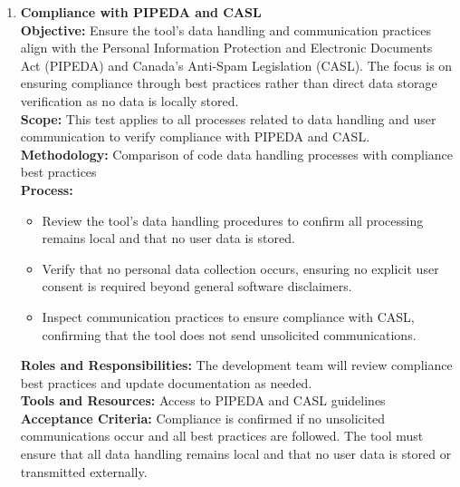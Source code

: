 \documentclass[12pt, titlepage]{article}
\begin{document}
\begin{enumerate}[label={\bf \textcolor{Maroon}{test-SRT-\arabic*}}, wide=0pt, font=\itshape]
\begin{enumerate}[label={\bf \textcolor{Maroon}{test-CPL-\arabic*}}, wide=0pt, font=\itshape]
  \item \textbf{Compliance with PIPEDA and CASL} \\[2mm]
    \textbf{Objective:} Ensure the tool’s data handling and communication practices align with the Personal Information Protection and Electronic Documents Act (PIPEDA) and Canada’s Anti-Spam Legislation (CASL). The focus is on ensuring compliance through best practices rather than direct data storage verification as no data is locally stored. \\[2mm]
    \textbf{Scope:} This test applies to all processes related to data handling and user communication to verify compliance with PIPEDA and CASL. \\[2mm]
    \textbf{Methodology:} Comparison of code data handling processes with compliance best practices \\[2mm]
    \textbf{Process:}
    \begin{itemize}
      \item Review the tool’s data handling procedures to confirm all processing remains local and that no user data is stored.
      \item Verify that no personal data collection occurs, ensuring no explicit user consent is required beyond general software disclaimers.
      \item Inspect communication practices to ensure compliance with CASL, confirming that the tool does not send unsolicited communications.
    \end{itemize}
    \textbf{Roles and Responsibilities:} The development team will review compliance best practices and update documentation as needed. \\[2mm]
    \textbf{Tools and Resources:} Access to PIPEDA and CASL guidelines \\[2mm]
    \textbf{Acceptance Criteria:} Compliance is confirmed if no unsolicited communications occur and all best practices are followed. The tool must ensure that all data handling remains local and that no user data is stored or transmitted externally.


\end{enumerate}
\end{enumerate}
\end{document}
